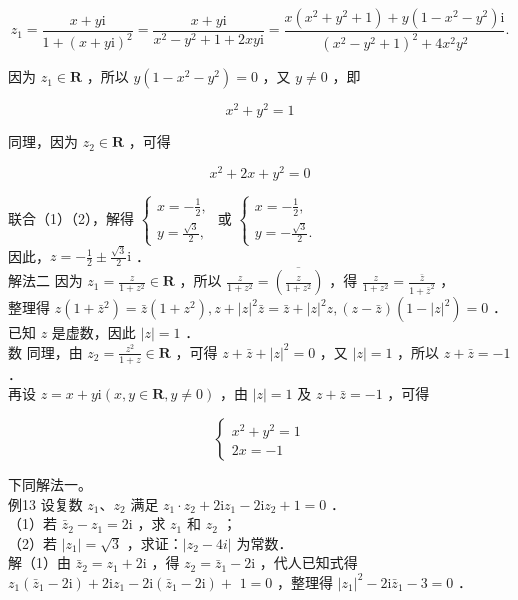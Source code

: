 \documentclass[10pt]{article}
\begin{document}
\[
z_{1}=\frac{x+y \mathrm{i}}{1+(x+y \mathrm{i})^{2}}=\frac{x+y \mathrm{i}}{x^{2}-y^{2}+1+2 x y \mathrm{i}}=\frac{x\left(x^{2}+y^{2}+1\right)+y\left(1-x^{2}-y^{2}\right) \mathrm{i}}{\left(x^{2}-y^{2}+1\right)^{2}+4 x^{2} y^{2}} .
\]

因为 \(z_{1} \in \mathbf{R}\) ，所以 \(y\left(1-x^{2}-y^{2}\right)=0\) ，又 \(y \neq 0\) ，即

\[
x^{2}+y^{2}=1
\]

同理，因为 \(z_{2} \in \mathbf{R}\) ，可得

\[
x^{2}+2 x+y^{2}=0
\]

联合（1）（2），解得 \(\left\{\begin{array}{l}x=-\frac{1}{2}, \\ y=\frac{\sqrt{3}}{2},\end{array}\right.\) 或 \(\left\{\begin{array}{l}x=-\frac{1}{2}, \\ y=-\frac{\sqrt{3}}{2} .\end{array}\right.\)\\
因此，\(z=-\frac{1}{2} \pm \frac{\sqrt{3}}{2} \mathrm{i}\) ．\\
解法二 因为 \(z_{1}=\frac{z}{1+z^{2}} \in \mathbf{R}\) ，所以 \(\frac{z}{1+z^{2}}=\overline{\left(\frac{z}{1+z^{2}}\right)}\) ，得 \(\frac{z}{1+z^{2}}=\frac{\bar{z}}{1+\bar{z}^{2}}\) ，\\
整理得 \(z\left(1+\bar{z}^{2}\right)=\bar{z}\left(1+z^{2}\right), z+|z|^{2} \bar{z}=\bar{z}+|z|^{2} z,(z-\bar{z})\left(1-|z|^{2}\right)=0\) ．\\
已知 \(z\) 是虚数，因此 \(|z|=1\) ．\\
数 同理，由 \(z_{2}=\frac{z^{2}}{1+z} \in \mathbf{R}\) ，可得 \(z+\bar{z}+|z|^{2}=0\) ，又 \(|z|=1\) ，所以 \(z+\bar{z}=-1\) ．\\
再设 \(z=x+y \mathrm{i}(x, y \in \mathbf{R}, y \neq 0)\) ，由 \(|z|=1\) 及 \(z+\bar{z}=-1\) ，可得

\[
\left\{\begin{array}{l}
x^{2}+y^{2}=1 \\
2 x=-1
\end{array}\right.
\]

下同解法一。\\
例13 设复数 \(z_{1} 、 z_{2}\) 满足 \(z_{1} \cdot z_{2}+2 \mathrm{i} z_{1}-2 \mathrm{i} z_{2}+1=0\) ．\\
（1）若 \(\bar{z}_{2}-z_{1}=2 \mathrm{i}\) ，求 \(z_{1}\) 和 \(z_{2}\) ；\\
（2）若 \(\left|z_{1}\right|=\sqrt{3}\) ，求证：\(\left|z_{2}-4 i\right|\) 为常数．\\
解（1）由 \(\bar{z}_{2}=z_{1}+2 \mathrm{i}\) ，得 \(z_{2}=\bar{z}_{1}-2 \mathrm{i}\) ，代人已知式得 \(z_{1}\left(\bar{z}_{1}-2 \mathrm{i}\right)+2 \mathrm{i} z_{1}-2 \mathrm{i}\left(\bar{z}_{1}-2 \mathrm{i}\right)+\) \(1=0\) ，整理得 \(\left|z_{1}\right|^{2}-2 \mathrm{i} \bar{z}_{1}-3=0\) ．
\end{document}
